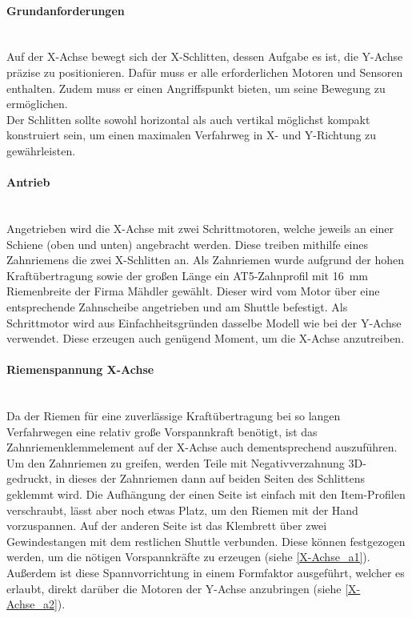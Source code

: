 \paragraph{Grundanforderungen}\mbox{}\\
Auf der X-Achse bewegt sich der X-Schlitten, dessen Aufgabe es ist, die Y-Achse präzise zu positionieren. Dafür muss er alle erforderlichen Motoren und Sensoren enthalten. Zudem muss er einen Angriffspunkt bieten, um seine Bewegung zu ermöglichen.
\\
Der Schlitten sollte sowohl horizontal als auch vertikal möglichst kompakt konstruiert sein, um einen maximalen Verfahrweg in X- und Y-Richtung zu gewährleisten.

\paragraph{Antrieb}\mbox{}\\
Angetrieben wird die X-Achse mit zwei Schrittmotoren, welche jeweils an einer Schiene (oben und unten) angebracht werden. Diese treiben mithilfe eines Zahnriemens die zwei X-Schlitten an. Als Zahnriemen wurde aufgrund der hohen Kraftübertragung sowie der großen Länge ein AT5-Zahnprofil mit \SI{16}{\mm} Riemenbreite der Firma Mähdler gewählt. Dieser wird vom Motor über eine entsprechende Zahnscheibe angetrieben und am Shuttle befestigt. Als Schrittmotor wird aus Einfachheitsgründen dasselbe Modell wie bei der Y-Achse verwendet. Diese erzeugen auch genügend Moment, um die X-Achse anzutreiben.

\paragraph{Riemenspannung X-Achse} \mbox{}\\
Da der Riemen für eine zuverlässige Kraftübertragung bei so langen Verfahrwegen eine relativ große Vorspannkraft benötigt, ist das Zahnriemenklemmelement auf der X-Achse auch dementsprechend auszuführen. Um den Zahnriemen zu greifen, werden Teile mit Negativverzahnung 3D-gedruckt, in dieses der Zahnriemen dann auf beiden Seiten des Schlittens geklemmt wird. Die Aufhängung der einen Seite ist einfach mit den Item-Profilen verschraubt, lässt aber noch etwas Platz, um den Riemen mit der Hand vorzuspannen. Auf der anderen Seite ist das Klembrett über zwei Gewindestangen mit dem restlichen Shuttle verbunden. Diese können festgezogen werden, um die nötigen Vorspannkräfte zu erzeugen (siehe \ref{X-Achse_a1}). Außerdem ist diese Spannvorrichtung in einem Formfaktor ausgeführt, welcher es erlaubt, direkt darüber die Motoren der Y-Achse anzubringen (siehe \ref{X-Achse_a2}).

